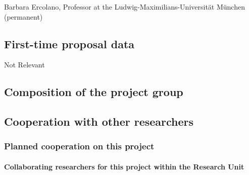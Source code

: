 \documentclass[10pt,fleqn,twoside]{article}
\begin{document}
Barbara Ercolano, Professor at the Ludwig-Maximilians-Universit\"at
M\"unchen  (permanent)



\subsection{First-time proposal data}

Not Relevant

\subsection{Composition of the project group}


\subsection{Cooperation with other researchers}

\subsubsection{Planned cooperation on this project}

\paragraph{Collaborating researchers for this project within the
  Research Unit}
\end{document}
